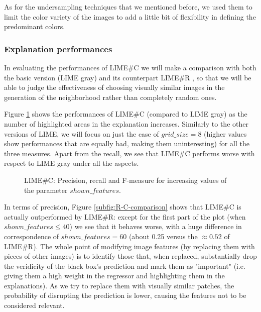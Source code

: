 \documentclass[12pt, twoside, a4paper]{report}
\begin{document}
As for the undersampling techniques that we mentioned before, we used them to limit the color variety of the images to add a little bit of flexibility in defining the predominant colors.


\subsubsection{Explanation performances}

In evaluating the performances of LIME\#C we will make a comparison with both the basic version (LIME gray) and its counterpart LIME\#R , so that we will be able to judge the effectiveness of choosing visually similar images in the generation of the neighborhood rather than completely random ones. 

Figure \ref{subfig:limesharp_C_vs_sf} shows the performances of LIME\#C (compared to LIME gray) as the number of highlighted areas in the explanation increases. Similarly to the other versions of LIME, we will focus on just the case of $grid\_size = 8$ (higher values show performances that are equally bad, making them uninteresting) for all the three measures. Apart from the recall, we see that LIME\#C performs worse with respect to LIME gray under all the aspects.

\begin{figure}
\centering
{}
\caption{LIME\#C: Precision, recall and F-measure for increasing values of the parameter $shown\_features$.}
\label{subfig:limesharp_C_vs_sf}
\end{figure}

In terms of precision, Figure \ref{subfig:R-C-comparison} shows that  LIME\#C is actually outperformed by LIME\#R: except for the first part of the plot (when $shown\_features \leq 40$) we see that it behaves worse, with a huge difference in correspondence of $shown\_features = 60$ (about 0.25 versus the $\approx 0.52$ of LIME\#R). The whole point of modifying image features (by replacing them with pieces of other images) is to identify those that, when replaced, substantially drop the veridicity of the black box's prediction and mark them as "important" (i.e. giving them a high weight in the regressor and highlighting them in the explanations). As we try to replace them with visually similar patches, the probability of disrupting the prediction is lower, causing the features not to be considered relevant.
\end{document}

